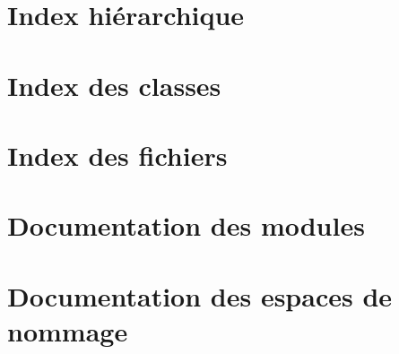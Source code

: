 \let\mypdfximage\pdfximage\def\pdfximage{\immediate\mypdfximage}\documentclass[twoside]{book}
\newcommand{\+}{\discretionary{\mbox{\scriptsize$\hookleftarrow$}}{}{}}
\begin{document}
\chapter{Index hiérarchique}

\chapter{Index des classes}

\chapter{Index des fichiers}

\chapter{Documentation des modules}







































\chapter{Documentation des espaces de nommage}







\end{document}

